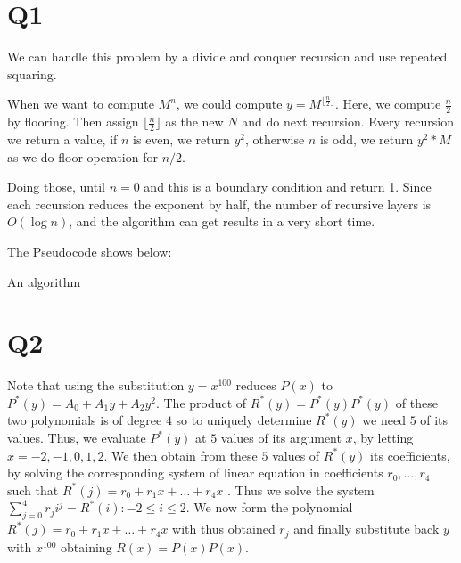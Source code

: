 \documentclass[a4paper]{article}
\begin{document}
	\section*{Q1}
	We can handle this problem by a divide and conquer recursion and use repeated squaring. 
	
	When we want to compute $M^n$, we could compute $y = M^{\lfloor \frac{n}{2} \rfloor}$. Here, we compute $\frac{n}{2}$ by flooring. Then assign $\lfloor \frac{n}{2}\rfloor$ as the new $N$ and do next recursion. Every recursion we return a value, if $n$ is even, we return $y^2$, otherwise $n$ is odd, we return $y^2 * M$ as we do floor operation for $n / 2$.
	
	Doing those, until $n = 0$ and this is a boundary condition and return 1. Since each recursion reduces the exponent by half, the number of recursive layers is $O(\log n)$, and the algorithm can get results in a very short time.
	
	The Pseudocode shows below:
	\begin{algorithm}
		\SetAlgoLined


		\caption{An algorithm \label{algorithm}}
	\end{algorithm}
	
	\section*{Q2}
	Note that using the substitution $y=x^{100}$ reduces $P(x)$ to $P^{*}(y) = A_0 + A_1y + A_2y^2$. The product of $R^{*}(y) = P^{*}(y)P^{*}(y)$ of these two polynomials is of degree $4$ so to uniquely determine $R^{*}(y)$ we need $5$ of its values.
	Thus, we evaluate $P^{*}(y)$ at $5$ values of its argument $x$, by letting $x = -2, -1, 0, 1, 2$. We then obtain from these $5$ values of $R^{*}(y)$ its coefficients, by solving the corresponding system of linear equation in coefficients $r_0,\dots,r_4$ such that $R^{*}(j) = r_0 +r_1x+\dots+r_4x$ . Thus we solve the system $\sum_{j=0}^{4}r_{j}i^j = R^{*}(i) : -2\leq i \leq 2$.
	We now form the polynomial $R^{*}(j) = r_0 +r_1x+\dots+r_4x$ with thus obtained $r_j$ and finally substitute back $y$ with $x^{100}$ obtaining $R(x)=P(x)P(x)$.
	
\end{document}
